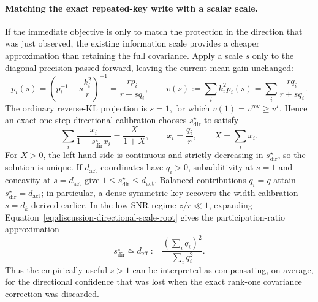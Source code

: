 \documentclass[11pt]{article}
\begin{document}
\paragraph{Matching the exact repeated-key write with a scalar scale.}
If the immediate objective is only to match the protection in the direction that was just
observed, the existing information scale provides a cheaper approximation than retaining the
full covariance. Apply a scale $s$ only to the diagonal precision passed forward, leaving the
current mean gain unchanged:
\begin{equation}
  p_i(s)
  =\left(p_i^{-1}+s\frac{k_i^2}{r}\right)^{-1}
  =\frac{rp_i}{r+sq_i},
  \qquad
  v(s):=\sum_i k_i^2p_i(s)
  =\sum_i\frac{rq_i}{r+sq_i}.
  \label{eq:discussion-directional-scale-update}
\end{equation}
The ordinary reverse-KL projection is $s=1$, for which
$v(1)=v^{\mathrm{rev}}\geq v^\star$. Hence an exact one-step directional calibration chooses
$s_{\mathrm{dir}}^\star$ to satisfy
\begin{equation}
  \sum_i\frac{x_i}{1+s_{\mathrm{dir}}^\star x_i}
  =\frac{X}{1+X},
  \qquad
  x_i=\frac{q_i}{r},
  \qquad
  X=\sum_i x_i.
  \label{eq:discussion-directional-scale-root}
\end{equation}
For $X>0$, the left-hand side is continuous and strictly decreasing in
$s_{\mathrm{dir}}^\star$, so the solution is unique. If $d_{\mathrm{act}}$ coordinates have
$q_i>0$, subadditivity at $s=1$ and concavity at $s=d_{\mathrm{act}}$ give
$1\leq s_{\mathrm{dir}}^\star\leq d_{\mathrm{act}}$. Balanced contributions
$q_i=q$ attain $s_{\mathrm{dir}}^\star=d_{\mathrm{act}}$; in particular, a dense symmetric key
recovers the width calibration $s=d_k$ derived earlier. In the low-SNR regime $z/r\ll1$, expanding
Equation~\eqref{eq:discussion-directional-scale-root} gives the participation-ratio approximation
\begin{equation}
  s_{\mathrm{dir}}^\star
  \simeq d_{\mathrm{eff}}
  :=\frac{\left(\sum_iq_i\right)^2}{\sum_iq_i^2}.
  \label{eq:discussion-directional-effective-dimension}
\end{equation}
Thus the empirically useful $s>1$ can be interpreted as compensating, on average, for the
directional confidence that was lost when the exact rank-one covariance correction was discarded.
\end{document}
